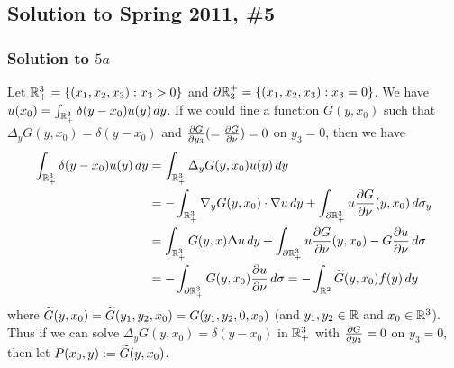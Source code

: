\subsection*{Solution to Spring 2011, \#5}\label{s115}
\subsubsection*{Solution to $5a$}
Let $\mathbb{R}^{3}_{+} = \{(x_1, x_2, x_3): x_3 > 0\}$ and $\partial\mathbb{R}_{3}^{+} = \{(x_1, x_2, x_3): x_3 = 0\}$. We have
$u(x_{0}) = \int_{\mathbb{R}^{3}_{+}}\delta(y - x_{0})u(y)\, dy$. If we could fine a function $G(y, x_{0})$ such that $\Delta_{y}G(y, x_{0}) = \delta(y - x_{0})$
and $\frac{\partial G}{\partial y_{3}} ( = \frac{\partial G}{\partial \nu}) = 0$ on $y_{3} = 0$, then we have
\begin{align*}
\int_{\mathbb{R}^{3}_{+}}\delta(y - x_{0})u(y)\, dy &= \int_{\mathbb{R}^{3}_{+}}\Delta_{y}G(y, x_{0})u(y)\, dy\\
&= -\int_{\mathbb{R}^{3}_{+}}\nabla_{y}G(y, x_0)\cdot \nabla u\, dy + \int_{\partial \mathbb{R}^{3}_{+}}u\frac{\partial G}{\partial \nu}(y, x_{0})\, d\sigma_{y}\\
&= \int_{\mathbb{R}^{3}_{+}}G(y, x)\Delta u\, dy + \int_{\partial \mathbb{R}^{3}_{+}}u\frac{\partial G}{\partial \nu}(y, x_{0}) - G\frac{\partial u}{\partial \nu}\, d\sigma\\
&= -\int_{\partial \mathbb{R}^{3}_{+}}G(y, x_{0})\frac{\partial u}{\partial \nu}\, d\sigma = -\int_{\mathbb{R}^{2}}\widetilde{G}(y, x_{0})f(y)\, dy
\end{align*}
where $\widetilde{G}(y, x_{0}) = \widetilde{G}(y_{1}, y_{2}, x_{0}) = G(y_{1}, y_{2}, 0, x_{0})$ (and $y_{1}, y_{2} \in \mathbb{R}$ and $x_{0} \in \mathbb{R}^{3}$).
Thus if we can solve $\Delta_{y}G(y, x_{0}) = \delta(y - x_{0})$ in $\mathbb{R}^{3}_{+}$ with $\frac{\partial G}{\partial y_{3}} = 0$ on $y_{3} = 0$,
then let $P(x_{0}, y) := \widetilde{G}(y, x_{0})$.

